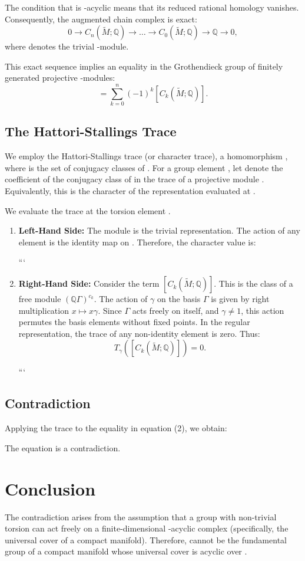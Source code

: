 \documentclass{article}
\theoremstyle{plain}
\begin{document}
The condition that  is -acyclic means that its reduced rational homology vanishes. Consequently, the augmented chain complex is exact:
\begin{equation}
0 \to C_n(\tilde{M}; \mathbb{Q}) \to \dots \to C_0(\tilde{M}; \mathbb{Q}) \to \mathbb{Q} \to 0,
\end{equation}
where  denotes the trivial -module.

This exact sequence implies an equality in the Grothendieck group  of finitely generated projective -modules:
\begin{equation}
[\mathbb{Q}] = \sum_{k=0}^n (-1)^k [C_k(\tilde{M}; \mathbb{Q})].
\end{equation}

\subsection{The Hattori-Stallings Trace}

We employ the Hattori-Stallings trace (or character trace), a homomorphism , where  is the set of conjugacy classes of . For a group element , let  denote the coefficient of the conjugacy class of  in the trace of a projective module . Equivalently, this is the character of the representation  evaluated at .

We evaluate the trace at the torsion element .

\begin{enumerate}
\item \textbf{Left-Hand Side:} The module  is the trivial representation. The action of any element  is the identity map on . Therefore, the character value is:

```
\item \textbf{Right-Hand Side:} Consider the term $[C_k(\tilde{M}; \mathbb{Q})]$. This is the class of a free module $(\mathbb{Q}\Gamma)^{c_k}$. The action of $\gamma$ on the basis $\Gamma$ is given by right multiplication $x \mapsto x\gamma$. Since $\Gamma$ acts freely on itself, and $\gamma \neq 1$, this action permutes the basis elements without fixed points. In the regular representation, the trace of any non-identity element is zero. Thus:
\[
T_\gamma([C_k(\tilde{M}; \mathbb{Q})]) = 0.
\]

```

\end{enumerate}

\subsection{Contradiction}

Applying the trace  to the equality in equation (2), we obtain:

The equation  is a contradiction.

\section{Conclusion}

The contradiction arises from the assumption that a group with non-trivial torsion can act freely on a finite-dimensional -acyclic complex (specifically, the universal cover of a compact manifold). Therefore,  cannot be the fundamental group of a compact manifold whose universal cover is acyclic over .
\end{document}
